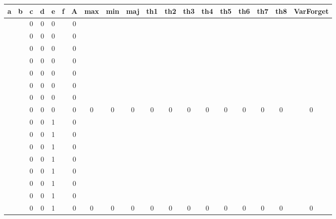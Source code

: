 \begin{table}[!tb]
    \centering
    \begin{tabular}{|c|c|c|c|c|c|c|c|c|c|c|c|c|c|c|c|c|c|c|}
        \hline
        \textbf{a} & \textbf{b} & \textbf{c} & \textbf{d} & \textbf{e} & \textbf{f} & \textbf{A} & \textbf{max} & \textbf{min} & \textbf{maj} & \textbf{th1} & \textbf{th2} & \textbf{th3} & \textbf{th4} & \textbf{th5} & \textbf{th6} & \textbf{th7} & \textbf{th8} & \textbf{VarForget} \\ \hline
        \rowcolor{gray!40}  &  & 0 & 0 & 0 &  & 0 &  &  &  &  &  &  &  &  &  &  &  &  \\ \hline
        \rowcolor{gray!40}  &  & 0 & 0 & 0 &  & 0 &  &  &  &  &  &  &  &  &  &  &  &  \\ \hline
        \rowcolor{gray!40}  &  & 0 & 0 & 0 &  & 0 &  &  &  &  &  &  &  &  &  &  &  &  \\ \hline
        \rowcolor{gray!40}  &  & 0 & 0 & 0 &  & 0 &  &  &  &  &  &  &  &  &  &  &  &  \\ \hline
        \rowcolor{gray!40}  &  & 0 & 0 & 0 &  & 0 &  &  &  &  &  &  &  &  &  &  &  &  \\ \hline
        \rowcolor{gray!40}  &  & 0 & 0 & 0 &  & 0 &  &  &  &  &  &  &  &  &  &  &  &  \\ \hline
        \rowcolor{gray!40}  &  & 0 & 0 & 0 &  & 0 &  &  &  &  &  &  &  &  &  &  &  &  \\ \hline
        \rowcolor{gray!40}  &  & 0 & 0 & 0 &  & 0 & 0 & 0 & 0 & 0 & 0 & 0 & 0 & 0 & 0 & 0 & 0 & 0 \\ \hline
        \rowcolor{blue!40}  &  & 0 & 0 & 1 &  & 0 &  &  &  &  &  &  &  &  &  &  &  &  \\ \hline
        \rowcolor{blue!40}  &  & 0 & 0 & 1 &  & 0 &  &  &  &  &  &  &  &  &  &  &  &  \\ \hline
        \rowcolor{blue!40}  &  & 0 & 0 & 1 &  & 0 &  &  &  &  &  &  &  &  &  &  &  &  \\ \hline
        \rowcolor{blue!40}  &  & 0 & 0 & 1 &  & 0 &  &  &  &  &  &  &  &  &  &  &  &  \\ \hline
        \rowcolor{blue!40}  &  & 0 & 0 & 1 &  & 0 &  &  &  &  &  &  &  &  &  &  &  &  \\ \hline
        \rowcolor{blue!40}  &  & 0 & 0 & 1 &  & 0 &  &  &  &  &  &  &  &  &  &  &  &  \\ \hline
        \rowcolor{blue!40}  &  & 0 & 0 & 1 &  & 0 &  &  &  &  &  &  &  &  &  &  &  &  \\ \hline
        \rowcolor{blue!40}  &  & 0 & 0 & 1 &  & 0 & 0 & 0 & 0 & 0 & 0 & 0 & 0 & 0 & 0 & 0 & 0 & 0 \\ \hline

\end{tabular}
\end{table}
